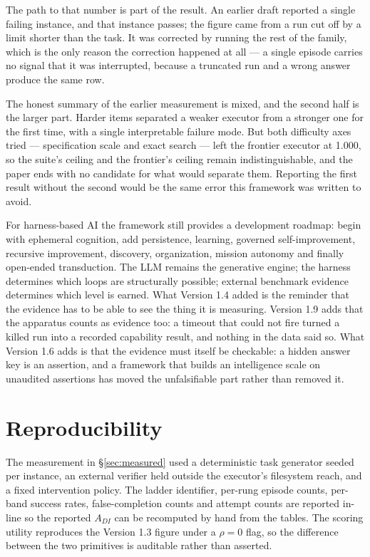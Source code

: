 \documentclass[11pt]{article}
\theoremstyle{definition}
\begin{document}
The path to that number is part of the result. An earlier draft reported a single failing instance, and that instance passes; the figure came from a run cut off by a limit shorter than the task. It was corrected by running the rest of the family, which is the only reason the correction happened at all --- a single episode carries no signal that it was interrupted, because a truncated run and a wrong answer produce the same row.

The honest summary of the earlier measurement is mixed, and the second half is the larger part. Harder items separated a weaker executor from a stronger one for the first time, with a single interpretable failure mode. But both difficulty axes tried --- specification scale and exact search --- left the frontier executor at 1.000, so the suite's ceiling and the frontier's ceiling remain indistinguishable, and the paper ends with no candidate for what would separate them. Reporting the first result without the second would be the same error this framework was written to avoid.

For harness-based AI the framework still provides a development roadmap: begin with ephemeral cognition, add persistence, learning, governed self-improvement, recursive improvement, discovery, organization, mission autonomy and finally open-ended transduction. The LLM remains the generative engine; the harness determines which loops are structurally possible; external benchmark evidence determines which level is earned. What Version 1.4 added is the reminder that the evidence has to be able to see the thing it is measuring. Version 1.9 adds that the apparatus counts as evidence too: a timeout that could not fire turned a killed run into a recorded capability result, and nothing in the data said so. What Version 1.6 adds is that the evidence must itself be checkable: a hidden answer key is an assertion, and a framework that builds an intelligence scale on unaudited assertions has moved the unfalsifiable part rather than removed it.

\section*{Reproducibility}

The measurement in \S\ref{sec:measured} used a deterministic task generator seeded per instance, an external verifier held outside the executor's filesystem reach, and a fixed intervention policy. The ladder identifier, per-rung episode counts, per-band success rates, false-completion counts and attempt counts are reported in-line so the reported $A_{DI}$ can be recomputed by hand from the tables. The scoring utility reproduces the Version 1.3 figure under a $\rho = 0$ flag, so the difference between the two primitives is auditable rather than asserted.
\end{document}

